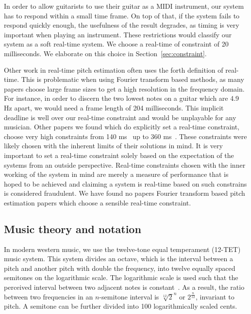 \documentclass[a4paper,10pt,twocolumn]{article}
\begin{document}
In order to allow guitarists to use their guitar as a MIDI instrument, our system has to respond within a small time frame. On top of that, if the system fails to respond quickly enough, the usefulness of the result degrades, as timing is very important when playing an instrument. These restrictions would classify our system as a soft real-time system. We choose a real-time of constraint of 20 milliseconds. We elaborate on this choice in Section~\ref{sec:constraint}.

Other work in real-time pitch estimation often uses the forth definition of real-time. This is problematic when using Fourier transform based methods, as many papers choose large frame sizes to get a high resolution in the frequency domain. For instance, in order to discern the two lowest notes on a guitar which are 4.9 Hz apart, we would need a frame length of 204 milliseconds. This implicit deadline is well over our real-time constraint and would be unplayable for any musician. Other papers we found which do explicitly set a real-time constraint, choose very high constraints from 140 ms~\cite{sloomboi} up to 360 ms~\cite{sloomboi2}. These constraints were likely chosen with the inherent limits of their solutions in mind. It is very important to set a real-time constraint solely based on the expectation of the systems from an outside perspective. Real-time constraints chosen with the inner working of the system in mind are merely a measure of performance that is hoped to be achieved and claiming a system is real-time based on such constrains is considered fraudulent. We have found no papers Fourier transform based pitch estimation papers which choose a sensible real-time constraint.


\subsection{Music theory and notation}
In modern western music, we use the twelve-tone equal temperament (12-TET) music system. This system divides an octave, which is the interval between a pitch and another pitch with double the frequency, into twelve equally spaced semitones on the logarithmic scale. The logarithmic scale is used such that the perceived interval between two adjacent notes is constant~\cite{perception}. As a result, the ratio between two frequencies in an $n$-semitone interval is $\sqrt[12]{2}^n$ or $2^{\frac{n}{12}}$, invariant to pitch. A semitone can be further divided into 100 logarithmically scaled cents. %
\end{document}
